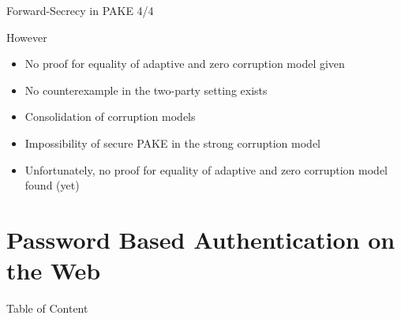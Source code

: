 \documentclass[notes,xcolor=dvipsnames]{beamer}
\begin{document}
\begin{frame}{Forward-Secrecy in PAKE 4/4}{}

	However
	\begin{itemize}
		\item No proof for equality of adaptive and zero corruption model given
		\item No counterexample in the two-party setting exists
	\end{itemize}
	
	\vspace*{2em}
	\begin{itemize}
		\item Consolidation of corruption models
		\item Impossibility of secure PAKE in the strong corruption model
		\item Unfortunately, no proof for equality of adaptive and zero corruption model found (yet)
	\end{itemize}

\end{frame}

\section{Password Based Authentication on the Web}

\begin{frame}{Table of Content}
\tableofcontents[currentsection]
\end{frame}

\newsavebox{\savelisting}
\newenvironment{listing}
{\vspace*{-2em}\begin{lrbox}{\savelisting}
\begin{minipage}{4.8in}
\begin{flushleft}}
{\end{flushleft}
\end{minipage}
\end{lrbox}
\begin{center}
\resizebox{\columnwidth}{!}{\setlength\fboxsep{6pt}\fbox{\usebox{\savelisting}}}
\end{center}}
\end{document}
